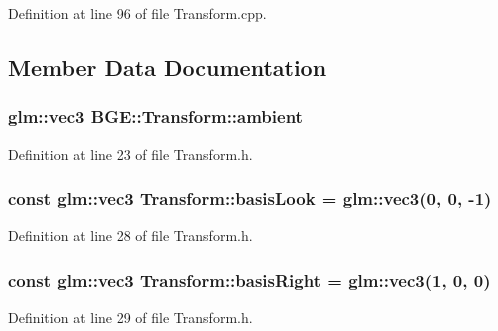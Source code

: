 Definition at line 96 of file Transform.\-cpp.



\subsection{Member Data Documentation}
\hypertarget{class_b_g_e_1_1_transform_a62b72900cf41dbeeebcc115c9ffba8e2}{
\subsubsection[{ambient}]{\setlength{\rightskip}{0pt plus 5cm}glm\-::vec3 B\-G\-E\-::\-Transform\-::ambient}}\label{class_b_g_e_1_1_transform_a62b72900cf41dbeeebcc115c9ffba8e2}


Definition at line 23 of file Transform.\-h.

\hypertarget{class_b_g_e_1_1_transform_a00e3d00aedfea161e5c1354e5fe80a54}{
\subsubsection[{basis\-Look}]{\setlength{\rightskip}{0pt plus 5cm}const glm\-::vec3 Transform\-::basis\-Look = glm\-::vec3(0, 0, -\/1)\hspace{0.3cm}{\ttfamily [static]}}}\label{class_b_g_e_1_1_transform_a00e3d00aedfea161e5c1354e5fe80a54}


Definition at line 28 of file Transform.\-h.

\hypertarget{class_b_g_e_1_1_transform_ab1f6463365cef7fdba189e99b519b7a5}{
\subsubsection[{basis\-Right}]{\setlength{\rightskip}{0pt plus 5cm}const glm\-::vec3 Transform\-::basis\-Right = glm\-::vec3(1, 0, 0)\hspace{0.3cm}{\ttfamily [static]}}}\label{class_b_g_e_1_1_transform_ab1f6463365cef7fdba189e99b519b7a5}


Definition at line 29 of file Transform.\-h.

